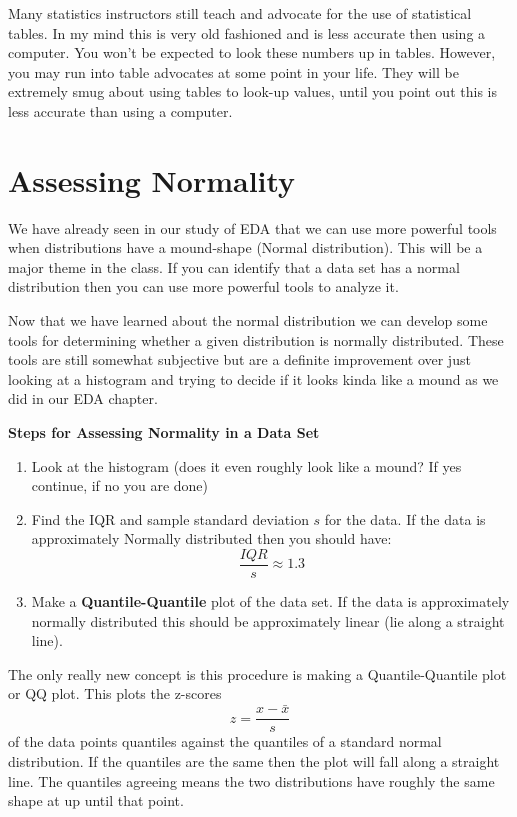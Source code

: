 \documentclass[
]{book}
\theoremstyle{definition}
\theoremstyle{definition}
\theoremstyle{definition}
\theoremstyle{definition}
\theoremstyle{remark}
\begin{document}
Many statistics instructors still teach and advocate for the use of statistical tables. In my mind this is very old fashioned and is less accurate then using a computer. You won't be expected to look these numbers up in tables. However, you may run into table advocates at some point in your life. They will be extremely smug about using tables to look-up values, until you point out this is less accurate than using a computer.

\hypertarget{assessing-normality}{%
\section{Assessing Normality}\label{assessing-normality}}

We have already seen in our study of EDA that we can use more powerful tools when distributions have a mound-shape (Normal distribution). This will be a major theme in the class. If you can identify that a data set has a normal distribution then you can use more powerful tools to analyze it.

Now that we have learned about the normal distribution we can develop some tools for determining whether a given distribution is normally distributed. These tools are still somewhat subjective but are a definite improvement over just looking at a histogram and trying to decide if it looks kinda like a mound as we did in our EDA chapter.

\textbf{Steps for Assessing Normality in a Data Set}

\begin{enumerate}
\def\labelenumi{\arabic{enumi}.}
\item
  Look at the histogram (does it even roughly look like a mound? If yes continue, if no you are done)
\item
  Find the IQR and sample standard deviation \(s\) for the data. If the data is approximately Normally distributed then you should have: \[\frac{IQR}{s}\approx 1.3\]
\item
  Make a \textbf{Quantile-Quantile} plot of the data set. If the data is approximately normally distributed this should be approximately linear (lie along a straight line).
\end{enumerate}

The only really new concept is this procedure is making a Quantile-Quantile plot or QQ plot. This plots the z-scores \[z=\frac{x-\bar{x}}{s}\] of the data points quantiles against the quantiles of a standard normal distribution. If the quantiles are the same then the plot will fall along a straight line. The quantiles agreeing means the two distributions have roughly the same shape at up until that point.
\end{document}
